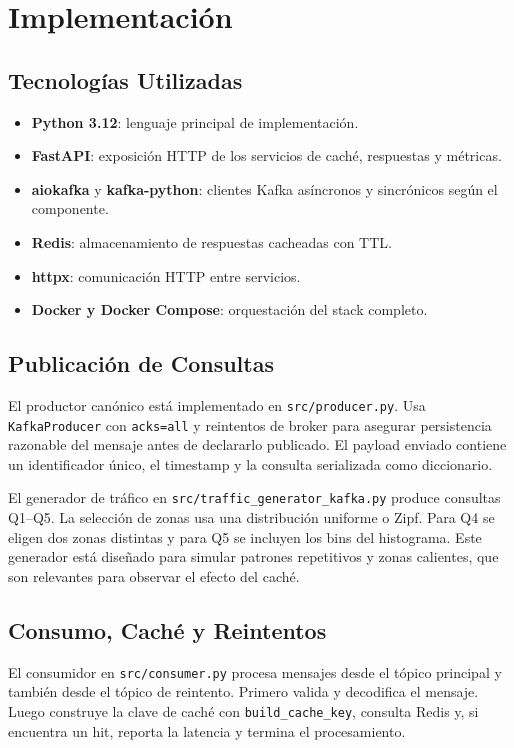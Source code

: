 \documentclass[letter,12pt]{article}
\begin{document}
\section{Implementaci\'on}
\subsection{Tecnolog\'ias Utilizadas}
\begin{itemize}
    \item \textbf{Python 3.12}: lenguaje principal de implementaci\'on.
    \item \textbf{FastAPI}: exposici\'on HTTP de los servicios de cach\'e, respuestas y m\'etricas.
    \item \textbf{aiokafka} y \textbf{kafka-python}: clientes Kafka as\'incronos y sincr\'onicos seg\'un el componente.
    \item \textbf{Redis}: almacenamiento de respuestas cacheadas con TTL.
    \item \textbf{httpx}: comunicaci\'on HTTP entre servicios.
    \item \textbf{Docker y Docker Compose}: orquestaci\'on del stack completo.
\end{itemize}

\subsection{Publicaci\'on de Consultas}
El productor can\'onico est\'a implementado en \texttt{src/producer.py}. Usa \texttt{KafkaProducer} con \texttt{acks=all} y reintentos de broker para asegurar persistencia razonable del mensaje antes de declararlo publicado. El payload enviado contiene un identificador \'{u}nico, el timestamp y la consulta serializada como diccionario.

El generador de tr\'afico en \texttt{src/traffic\_generator\_kafka.py} produce consultas Q1--Q5. La selecci\'on de zonas usa una distribuci\'on uniforme o Zipf. Para Q4 se eligen dos zonas distintas y para Q5 se incluyen los bins del histograma. Este generador est\'a dise\~nado para simular patrones repetitivos y zonas calientes, que son relevantes para observar el efecto del cach\'e.

\subsection{Consumo, Cach\'e y Reintentos}
El consumidor en \texttt{src/consumer.py} procesa mensajes desde el t\'opico principal y tambi\'en desde el t\'opico de reintento. Primero valida y decodifica el mensaje. Luego construye la clave de cach\'e con \texttt{build\_cache\_key}, consulta Redis y, si encuentra un hit, reporta la latencia y termina el procesamiento.
\end{document}
